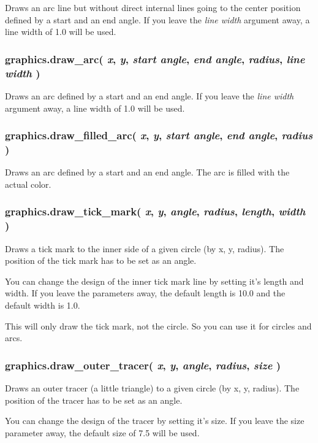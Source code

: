 \documentclass[11pt,parskip=half,a4paper]{scrartcl}
\begin{document}
Draws an arc line but without direct internal lines going to the center position defined by a start and an end angle. If you leave the \emph{line width} argument away, a line width of 1.0 will be used.

\subsubsection{graphics.draw\_arc( \emph{x}, \emph{y}, \emph{start angle}, \emph{end angle}, \emph{radius}, \emph{line width} )}

Draws an arc defined by a start and an end angle. If you leave the \emph{line width} argument away, a line width of 1.0 will be used.

\subsubsection{graphics.draw\_filled\_arc( \emph{x}, \emph{y}, \emph{start angle}, \emph{end angle}, \emph{radius} )}

Draws an arc defined by a start and an end angle. The arc is filled with the actual color.

\subsubsection{graphics.draw\_tick\_mark( \emph{x}, \emph{y}, \emph{angle}, \emph{radius}, \emph{length}, \emph{width} )}

Draws a tick mark to the inner side of a given circle (by x, y, radius). The position of the tick mark has to be set as an angle.

You can change the design of the inner tick mark line by setting it's length and width. If you leave the parameters away, the default length is 10.0 and the default width is 1.0.

This will only draw the tick mark, not the circle. So you can use it for circles and arcs.

\subsubsection{graphics.draw\_outer\_tracer( \emph{x}, \emph{y}, \emph{angle}, \emph{radius}, \emph{size} )}

Draws an outer tracer (a little triangle) to a given circle (by x, y, radius). The position of the tracer has to be set as an angle.

You can change the design of the tracer by setting it's size. If you leave the size parameter away, the default size of 7.5 will be used.
\end{document}
